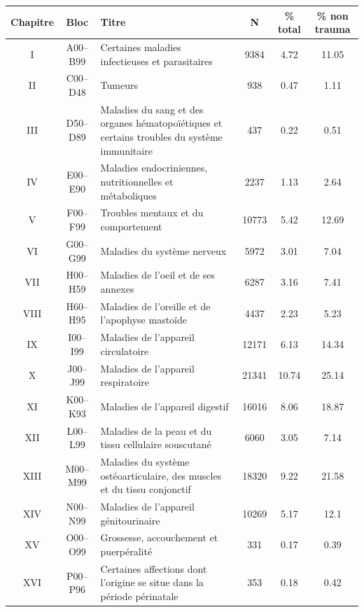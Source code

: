 \documentclass[12pt,english,french,twoside]{report}\usepackage[]{graphicx}\usepackage[]{color}
\begin{document}
\begin{longtable}{|c|c|m{4cm}|c|c|c|}
 \hline
 Chapitre & Bloc & Titre & N & \% total  & \% non trauma \\
 \hline
 
I & A00–B99 & Certaines maladies infectieuses et parasitaires & 9384 & 4.72 & 11.05 \\
 II&C00–D48&Tumeurs&938&0.47&1.11\\
 
III&D50–D89&Maladies du sang et des organes hématopoïétiques et certains troubles du système immunitaire&437&0.22&0.51\\

IV&E00–E90&Maladies endocriniennes, nutritionnelles et métaboliques&2237&1.13&2.64\\

V&F00–F99&Troubles mentaux et du comportement&10773&5.42&12.69\\

VI&G00–G99&Maladies du système nerveux&5972&3.01&7.04\\

VII & H00–H59 & Maladies de l'oeil et de ses annexes & 6287 & 3.16&7.41\\

VIII&H60–H95&Maladies de l'oreille et de l'apophyse mastoïde&4437&2.23&5.23\\

IX&I00–I99&Maladies de l'appareil circulatoire&12171&6.13&14.34\\

X&J00–J99&Maladies de l'appareil respiratoire&21341&10.74&25.14\\

XI&K00–K93&Maladies de l'appareil digestif&16016&8.06&18.87\\

XII&L00–L99&Maladies de la peau et du tissu cellulaire souscutané&6060&3.05&7.14\\

XIII&M00–M99&Maladies du système ostéoarticulaire, des muscles et du tissu conjonctif&18320&9.22&21.58\\

XIV&N00–N99&Maladies de l'appareil génitourinaire&10269&5.17&12.1\\

XV&O00–O99&Grossesse, accouchement et puerpéralité&331&0.17&0.39\\

XVI&P00–P96&Certaines affections dont l'origine se situe dans la période périnatale&353&0.18&0.42\\


\end{longtable}
\end{document}
